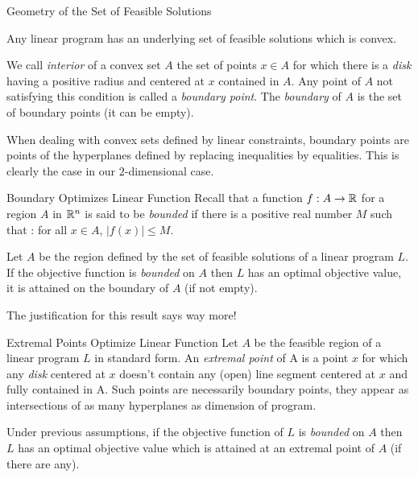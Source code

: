\documentclass[aspectratio = 169]{beamer}
\begin{document}
\begin{frame}{Geometry of the Set of Feasible Solutions}
  \begin{prop}
    Any linear program has an underlying set of feasible solutions
    which is convex.
  \end{prop}
  \begin{defn}
    We call \emph{interior} of a convex set $A$ the set of points
    $x \in A$ for which there is a \textit{disk} having a positive
    radius and centered at $x$ contained in $A$. Any point of $A$ not
    satisfying this condition is called a \emph{boundary point}. The
    \emph{boundary} of $A$ is the set of boundary points (it can be
    empty).
  \end{defn}
  When dealing with convex sets defined by linear constraints,
  boundary points are points of the hyperplanes defined by replacing
  inequalities by equalities. This is clearly the case in our
  $2$-dimensional case.
\end{frame}

\begin{frame}{Boundary Optimizes Linear Function}
  Recall that a function $f : A \to \mathbb{R}$ for a region $A$ in $\mathbb{R}^n$ is
  said to be \emph{bounded} if there is a positive real number $M$
  such that : for all $x \in A$, $\big|f(x)\big| \leq M$.
  \begin{prop}
    Let $A$ be the region defined by the set of feasible solutions of
    a linear program $L$. If the objective function is
    \textit{bounded} on $A$ then $L$ has an optimal objective value,
    it is attained on the boundary of $A$ (if not empty).
  \end{prop}
  The justification for this result says way more! 
\end{frame}

\begin{frame}{Extremal Points Optimize Linear Function}
  Let $A$ be the feasible region of a linear program $L$ in standard
  form. An \emph{extremal point} of A is a point $x$ for which any
  \textit{disk} centered at $x$ doesn't contain any (open) line
  segment centered at $x$ and fully contained in A. \pause Such points
  are necessarily boundary points, they appear as intersections of as
  many hyperplanes as dimension of program. \pause
  \begin{prop}
    Under previous assumptions, if the objective function of $L$ is
    \textit{bounded} on $A$ then $L$ has an optimal objective value
    which is attained at an extremal point of $A$ (if there are any).
    \end{prop}
\end{frame}
\end{document}

